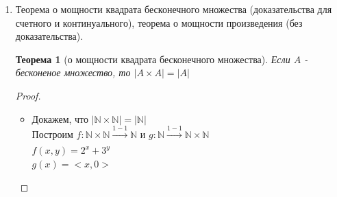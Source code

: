 \documentclass[a4paper]{article}
\newtheorem*{theorem*}{Теорема}
\newtheorem*{lemma*}{Лемма}
\theoremstyle{definition}
\begin{document}
\begin{enumerate}
\begin{proof}
\begin{enumerate}
                Построим $h : A \times B\xrightarrow[\text{на}]{1-1}A_{1} \times B_{1}$ так:
               $h_{1}(<x;y>)=<f(x),g(y)>$.
                Легко проверить, что $h_{1}$ - нужная биекция.
         \item Построим $h_{2} : A\cup B \xrightarrow[\text{на}]{1-1}A_{1}\cup B_{1}$ так:
               $h_{2}(x) =
                \left\{
                \begin{matrix}
                 f(x)\text{, если} x \in A \\
                 g(x)\text{, если} x \in B \\
                \end{matrix}
                \right.$
               Условие $A \cap B = \emptyset$ гарантирует, что определение корректно.
               Вновь нетрудно доказать, что $h_{2}$ - биекция. Проверим в качестве примера, что $h_{2}$ инъективна. Пусть $h_{2}(x)=h_{2}(y)$. Если $x,y \in A$, то получаем $f(x)=f(y)$ и $x=y$. Если $x,y \in B$, рассуждения аналогичны. Если же $x \in A, y \in B$  (или наоборот), то $h_{2}(x) \in A_{1}$ и $h_{2}(y) \in B_{1}$, что невозможно в силу $A_{1} \cap B_{2} = \emptyset$.
        \end{enumerate}
       \end{proof}
       \begin{lemma*}[о мощности объединения] Если хотя бы одно из множеств $A,B$ бесконечно, то $\left | A \cup B \right | = max\{\left | A \right |,\left | B \right |\}$.
       \end{lemma*}
 \item Теорема о мощности квадрата бесконечного множества (доказательства для счетного и континуального), теорема о мощности произведения (без доказательства).
       \begin{theorem*}[о мощности квадрата бесконечного множества]
        Если $A$ - бесконеное множество, то $|A\times{A}|=|A|$
       \end{theorem*}
       \begin{proof}\mbox{}\\
        \begin{itemize}
         \item Докажем, что $|\mathbb {N} \times{\mathbb{N}|} = |\mathbb {N}|$
               \\Построим $f: \mathbb{N}\times{\mathbb{N}} \xrightarrow[]{1-1}{\mathbb{N}}$ и $g: \mathbb{N}\xrightarrow[]{1-1}{\mathbb{N}\times{\mathbb{N}}}$
               \\ $f(x,y) = 2^x+3^y$
               \\ $g(x) = <x, 0>$

\end{itemize}
\end{proof}
\end{enumerate}
\end{document}
